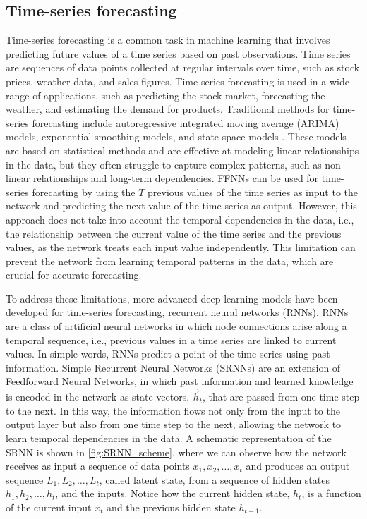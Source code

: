 \subsection{\label{sec:Time-series forecasting} Time-series forecasting}

Time-series forecasting is a common task in machine learning that involves
predicting future values of a time series based on past observations. Time
series are sequences of data points collected at regular intervals over time,
such as stock prices, weather data, and sales figures. Time-series
forecasting
is used in a wide range of applications, such as predicting the stock market,
forecasting the weather, and estimating the demand for products. Traditional
methods for time-series forecasting include autoregressive integrated moving
average (ARIMA) models, exponential smoothing models, and state-space models
\cite{Hyndman2018}. These models are based on statistical methods and are
effective at modeling linear relationships in the data, but they often
struggle
to capture complex patterns, such as non-linear relationships and long-term
dependencies. FFNNs can be used for time-series forecasting by using the $T$
previous values of the time series as input to the network and predicting the
next value of the time series as output. However, this approach does not take
into account the temporal dependencies in the data, i.e., the relationship
between the current value of the time series and the previous values, as the
network treats each input value independently. This limitation can prevent
the
network from learning temporal patterns in the data, which are crucial for
accurate forecasting.

To address these limitations, more advanced deep learning models have been
developed for time-series forecasting, recurrent neural networks (RNNs). RNNs
are a class of artificial neural networks in which node connections arise
along
a temporal sequence, i.e., previous values in a time series are linked to
current values. In simple words, RNNs predict a point of the time series
using
past information. Simple Recurrent Neural Networks (SRNNs) are an extension
of
Feedforward Neural Networks, in which past information and learned knowledge
is
encoded in the network as state vectors, $\vec{h}_t$, that are passed from
one
time step to the next. In this way, the information flows not only from the
input to the output layer but also from one time step to the next,
allowing the network to learn temporal dependencies in the data. A schematic
representation of the SRNN is shown in \cref{fig:SRNN_scheme}, where we can
observe how the network receives as input a sequence of data points $x_1,
  x_2,
  \ldots, x_t$ and produces an output sequence $L_1, L_2, \ldots, L_t$, called
latent state, from a sequence of hidden states $h_1, h_2, \ldots, h_t$, and
the
inputs. Notice how the current hidden state, $h_t$, is a function of the
current input $x_{t}$ and the previous hidden state $h_{t-1}$.

